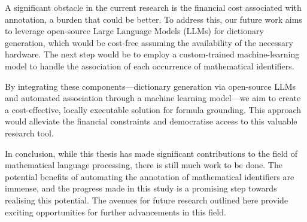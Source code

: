 A significant obstacle in the current research is the financial cost associated with annotation, a burden that could be better. To address this, our future work aims to leverage open-source Large Language Models (LLMs) for dictionary generation, which would be cost-free assuming the availability of the necessary hardware. The next step would be to employ a custom-trained machine-learning model to handle the association of each occurrence of mathematical identifiers.

By integrating these components—dictionary generation via open-source LLMs and automated association through a machine learning model—we aim to create a cost-effective, locally executable solution for formula grounding. This approach would alleviate the financial constraints and democratise access to this valuable research tool.

In conclusion, while this thesis has made significant contributions to the field of mathematical language processing, there is still much work to be done. The potential benefits of automating the annotation of mathematical identifiers are immense, and the progress made in this study is a promising step towards realising this potential. The avenues for future research outlined here provide exciting opportunities for further advancements in this field.